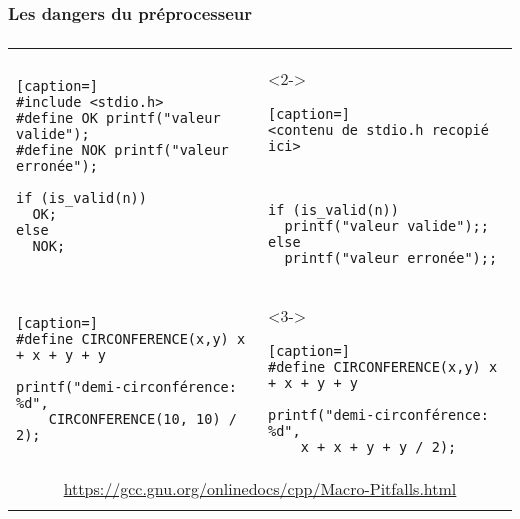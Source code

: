 \subsubsection{Les dangers du préprocesseur}
\begin{frame}[fragile]
\frametitle{\insertsubsubsection}
\begin{center}
\begin{tabular}{p{5.5cm} p{5.5cm}}
\begin{lstlisting}[caption=]
#include <stdio.h>
#define OK printf("valeur valide");
#define NOK printf("valeur erronée");

if (is_valid(n))
  OK;
else
  NOK;
\end{lstlisting} & 
\begin{onlyenv}<2->
\begin{lstlisting}[caption=]
<contenu de stdio.h recopié ici>



if (is_valid(n))
  printf("valeur valide");;
else
  printf("valeur erronée");;

\end{lstlisting}
\end{onlyenv} \\
\begin{lstlisting}[caption=]
#define CIRCONFERENCE(x,y) x + x + y + y

printf("demi-circonférence: %d", 
    CIRCONFERENCE(10, 10) / 2);
\end{lstlisting} &
\begin{onlyenv}<3->
\begin{lstlisting}[caption=]
#define CIRCONFERENCE(x,y) x + x + y + y

printf("demi-circonférence: %d", 
    x + x + y + y / 2);
\end{lstlisting}
\end{onlyenv}
\onslide<4->{\\
\multicolumn{2}{c}{ \url{https://gcc.gnu.org/onlinedocs/cpp/Macro-Pitfalls.html} }
\\
}

\end{tabular}
\end{center}
\end{frame}

